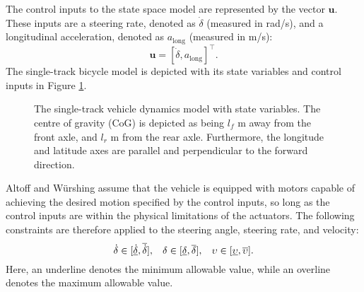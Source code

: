 

The control inputs to the state space model are represented by the vector $\mathbf{u}$. These inputs are a steering rate, denoted as $\dot{\delta}$ (measured in rad/s), and a longitudinal acceleration, denoted as $a_{\text{long}}$ (measured in m/s):
\begin{equation}
    \mathbf{u} = [\dot{\delta}, a_{\text{long}}]^\intercal.
\end{equation}
The single-track bicycle model is depicted with its state variables and control inputs in Figure \ref{fig:vehicle_dynamics_model}.


\begin{figure}[htb!]
    \centering
    
    \caption[The single tack vehicle dynamics model]{The single-track vehicle dynamics model with state variables. The centre of gravity (CoG) is depicted as being $l_f$ m away from the front axle, and $l_r$ m from the rear axle. Furthermore, the longitude and latitude axes are parallel and perpendicular to the forward direction.}
    \label{fig:vehicle_dynamics_model}
\end{figure}


Altoff and  W\"{u}rshing \cite{Althoff2020} assume that the vehicle is equipped with motors capable of achieving the desired motion specified by the control inputs, so long as the control inputs are within the physical limitations of the actuators.
The following constraints are therefore applied to the steering angle, steering rate, and velocity:
\begin{equation}
\dot{\delta} \in [\underline{\dot{\delta}}, \overline{\dot{\delta}}], \hspace{0.3cm} 
\delta \in [\underline{\delta}, \overline{\delta}], \hspace{0.3cm} 
\upsilon \in [\underline{\upsilon}, \overline{\upsilon}].
\label{eq:control_constraints}
\end{equation}
Here, an underline denotes the minimum allowable value, while an overline denotes the maximum allowable value.

